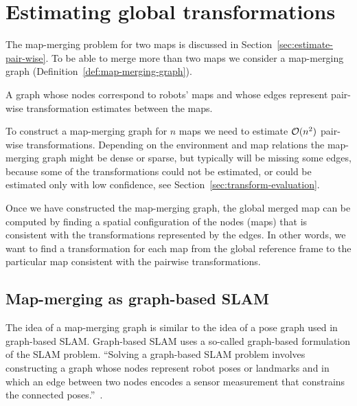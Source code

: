 
\section{Estimating global transformations}
\label{sec:estimate-global}

The map-merging problem for two maps is discussed in Section~\ref{sec:estimate-pair-wise}. To be able to merge more than two maps we consider a map-merging graph (Definition~\ref{def:map-merging-graph}).

\begin{defn}
    \label{def:map-merging-graph}
    A graph whose nodes correspond to robots' maps and whose edges represent pair-wise transformation estimates between the maps.
\end{defn}

To construct a map-merging graph for $n$ maps we need to estimate $\operatorname{\mathcal{O}}(n^2)$ pair-wise transformations. Depending on the environment and map relations the map-merging graph might be dense or sparse, but typically will be missing some edges, because some of the transformations could not be estimated, or could be estimated only with low confidence, see Section~\ref{sec:transform-evaluation}.

Once we have constructed the map-merging graph, the global merged map can be computed by finding a spatial configuration of the nodes (maps) that is consistent with the transformations represented by the edges. In other words, we want to find a transformation for each map from the global reference frame to the particular map consistent with the pairwise transformations.

\subsection{Map-merging as graph-based SLAM}

The idea of a map-merging graph is similar to the idea of a pose graph used in graph-based \gls{SLAM}. Graph-based \gls{SLAM} uses a so-called graph-based formulation of the \gls{SLAM} problem. ``Solving a graph-based \gls{SLAM} problem involves constructing a graph whose nodes represent robot poses or landmarks and in which an edge between two nodes encodes a sensor measurement that constrains the connected poses.''~\citep{grisetti2010tutorial}.

